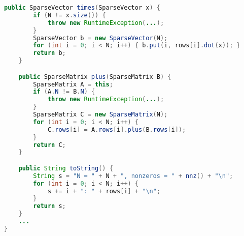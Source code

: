 \documentclass[8pt,a4paper,compress]{beamer}
\begin{document}
\begin{frame}[fragile]
\begin{lstlisting}[language=Java]
    public SparseVector times(SparseVector x) {
        if (N != x.size()) {
            throw new RuntimeException(...);
        }
        SparseVector b = new SparseVector(N);
        for (int i = 0; i < N; i++) { b.put(i, rows[i].dot(x)); }
        return b;
    }

    public SparseMatrix plus(SparseMatrix B) {
        SparseMatrix A = this;
        if (A.N != B.N) { 
            throw new RuntimeException(...); 
        }
        SparseMatrix C = new SparseMatrix(N);
        for (int i = 0; i < N; i++) { 
            C.rows[i] = A.rows[i].plus(B.rows[i]); 
        }
        return C;
    }

    public String toString() {
        String s = "N = " + N + ", nonzeros = " + nnz() + "\n";
        for (int i = 0; i < N; i++) {
            s += i + ": " + rows[i] + "\n";
        }
        return s;
    }
    ...
}
\end{lstlisting}
\end{frame}
\end{document}
